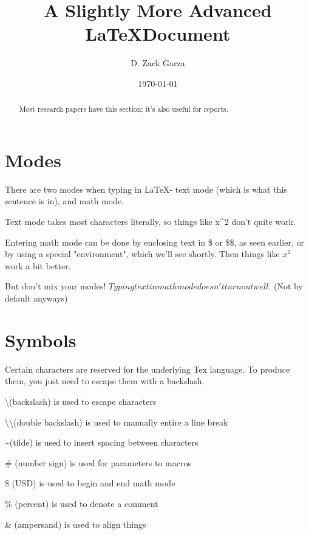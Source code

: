 \documentclass{article}
\author{D. Zack Garza}
\title{A Slightly More Advanced \LaTeX Document}
\date{\today}
\begin{document}
\maketitle
\newpage
\tableofcontents
\newpage


\begin{abstract}
Most research papers have this section; it's also useful for reports.
\end{abstract}

\section{Modes}
There are two modes when typing in \LaTeX - text mode (which is what this sentence is in), and math mode.

Text mode takes most characters literally, so things like x^2 don't quite work.

Entering math mode can be done by enclosing text in \$ or \$\$, as seen earlier, or by using a special "environment", which we'll see shortly. Then things like $x^2$ work a bit better.

But don't mix your modes! $Typing text in math mode doesn't turn out well.$ (Not by default anyways)

\section{Symbols}
Certain characters are reserved for the underlying Tex language. To produce them, you just need to escape them with a backslash.

\textbackslash (backslash) is used to escape characters

\textbackslash\textbackslash (double backslash) is used to manually entire a line break

\textasciitilde (tilde) is used to insert spacing between characters

\# (number sign) is used for parameters to macros

\$ (USD) is used to begin and end math mode

\% (percent) is used to denote a comment

\& (ampersand) is used to align things
\end{document}
